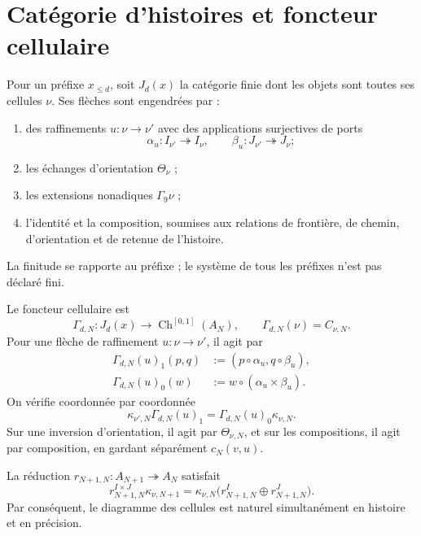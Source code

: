 \section{Catégorie d'histoires et foncteur cellulaire}
\label{sec:pdfv2-coh-category}

Pour un préfixe \(x_{\leq d}\), soit \(J_d(x)\) la catégorie finie dont les
objets sont toutes ses cellules \(\nu\). Ses flèches sont engendrées par :
\begin{enumerate}
 \item des raffinements \(u:\nu\to\nu'\) avec des applications surjectives de
       ports
       \[
        \alpha_u:I_{\nu'}\twoheadrightarrow I_\nu,
        \qquad
        \beta_u:J_{\nu'}\twoheadrightarrow J_\nu;
       \]
 \item les échanges d'orientation \(\Theta_\nu\) ;
 \item les extensions nonadiques \(\Gamma_9\nu\) ;
 \item l'identité et la composition, soumises aux relations de frontière,
       de chemin, d'orientation et de retenue de l'histoire.
\end{enumerate}
La finitude se rapporte au préfixe ; le système de tous les préfixes n'est pas
déclaré fini.

Le foncteur cellulaire est
\begin{equation}\label{eq:pdfv2-coh-gamma-functor}
 \Gamma_{d,N}:J_d(x)\longrightarrow
 \operatorname{Ch}^{[0,1]}(A_N),
 \qquad
 \Gamma_{d,N}(\nu)=C_{\nu,N}.
\end{equation}
Pour une flèche de raffinement \(u:\nu\to\nu'\), il agit par
\begin{align}
 \Gamma_{d,N}(u)_1(p,q)
 &:=(p\circ\alpha_u,q\circ\beta_u),
 \label{eq:pdfv2-coh-gamma-one}\\
 \Gamma_{d,N}(u)_0(w)
 &:=w\circ(\alpha_u\times\beta_u).
 \label{eq:pdfv2-coh-gamma-zero}
\end{align}
On vérifie coordonnée par coordonnée
\begin{equation}\label{eq:pdfv2-coh-gamma-chain-map}
 \kappa_{\nu',N}\Gamma_{d,N}(u)_1
 =\Gamma_{d,N}(u)_0\kappa_{\nu,N}.
\end{equation}
Sur une inversion d'orientation, il agit par
\(\Theta_{\nu,N}\), et sur les compositions, il agit par composition, en gardant
séparément \(c_N(v,u)\).

La réduction \(r_{N+1,N}:A_{N+1}\twoheadrightarrow A_N\) satisfait
\begin{equation}\label{eq:pdfv2-coh-kappa-reduction}
 r_{N+1,N}^{I\times J}\kappa_{\nu,N+1}
 =\kappa_{\nu,N}
  \bigl(r_{N+1,N}^{I}\oplus r_{N+1,N}^{J}\bigr).
\end{equation}
Par conséquent, le diagramme des cellules est naturel simultanément en histoire et en
précision.

